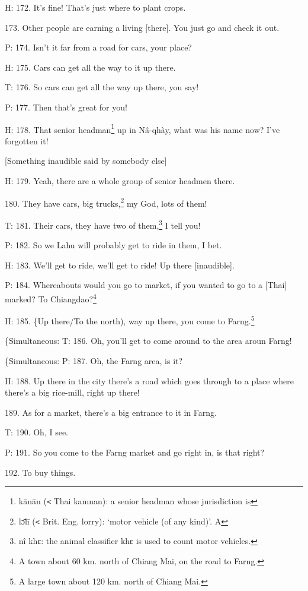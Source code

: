 H: 172. It's fine! That's just where to plant crops.

173. Other people are earning a living [there]. You just go and check it out.

P: 174. Isn't it far from a road for cars, your place?

H: 175. Cars can get all the way to it up there.

T: 176. So cars can get all the way up there, you say!

P: 177. Then that's great for you!

H: 178. That senior headman\footnote{kānān (\texttt{<} Thai kamnan): a senior headman whose jurisdiction is} up in Nâ-qhày, what was his name now? I've forgotten
it!

[Something inaudible said by somebody else]

H: 179. Yeah, there are a whole group of senior headmen there.

180. They have cars, big trucks,\footnote{lɔ̄lī (\texttt{<} Brit. Eng. lorry): `motor vehicle (of any kind)'. A} my God, lots of them!

T: 181. Their cars, they have two of them,\footnote{nî khɛ: the animal classifier khɛ is used to count motor vehicles.} I tell you!

P: 182. So we Lahu will probably get to ride in them, I bet.

H: 183. We'll get to ride, we'll get to ride! Up there [inaudible].

P: 184. Whereabouts would you go to market, if you wanted to go to a [Thai] marked?
To Chiangdao?\footnote{A town about 60 km. north of Chiang Mai, on the road to Farng.}

H: 185. \{Up there/To the north), way up there, you come to Farng.\footnote{A large town about 120 km. north of Chiang Mai.}

\{Simultaneous: T: 186. Oh, you'll get to come around to the area aroun Farng!

\{Simultaneous: P: 187. Oh, the Farng area, is it?

H: 188. Up there in the city there's a road which goes through to a place where
there's a big rice-mill, right up there!

189. As for a market, there's a big entrance to it in Farng.

T: 190. Oh, I see.

P: 191. So you come to the Farng market and go right in, is that right?

192. To buy things.

